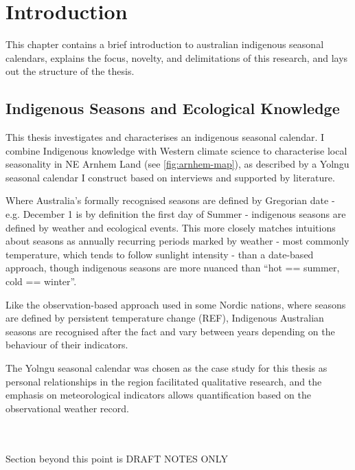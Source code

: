 \chapter{Introduction}
This chapter contains a brief introduction to australian indigenous seasonal calendars,
explains the focus, novelty, and delimitations of this research,
and lays out the structure of the thesis.


\section{Indigenous Seasons and Ecological Knowledge}


This thesis investigates and characterises an indigenous seasonal calendar.
I combine Indigenous knowledge with Western climate science to characterise
local seasonality in NE Arnhem Land (see \autoref{fig:arnhem-map}),
as described by a Yolngu seasonal calendar I construct based on
interviews and supported by literature.


Where Australia's formally recognised seasons are defined by Gregorian date -
e.g. December 1 is by definition the first day of Summer - indigenous seasons
are defined by weather and ecological events.
%
This more closely matches intuitions about seasons as annually recurring
periods marked by weather - most commonly temperature, which tends to
follow sunlight intensity - than a date-based approach, though indigenous
seasons are more nuanced than ``hot == summer, cold == winter''.

Like the observation-based approach used in some Nordic nations, where
seasons are defined by persistent temperature change (REF),
Indigenous Australian seasons are recognised after the fact and vary
between years depending on the behaviour of their indicators.


The Yolngu seasonal calendar was chosen as the case study for this thesis
as personal relationships in the region facilitated qualitative research,
and the emphasis on meteorological indicators allows quantification based
on the observational weather record.
    


~\\
~\\
Section beyond this point is DRAFT NOTES ONLY


